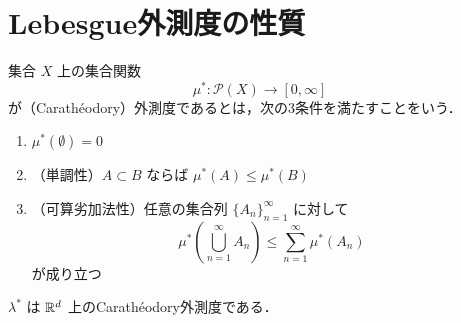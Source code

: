 
\section{Lebesgue外測度の性質}

\begin{definition}[Carathéodory外測度]
集合 $X$ 上の集合関数
\[
\mu^* : \mathcal P(X) \to [0,\infty]
\]
が（Carathéodory）外測度であるとは，次の3条件を満たすことをいう．
\begin{enumerate}
    \item $\mu^*(\emptyset)=0$
    \item （単調性）$A \subset B$ ならば $\mu^*(A) \le \mu^*(B)$
    \item （可算劣加法性）任意の集合列 $\{A_n\}_{n=1}^{\infty}$ に対して
    \[
    \mu^*\left(\bigcup_{n=1}^{\infty} A_n\right)
    \le
    \sum_{n=1}^{\infty} \mu^*(A_n)
    \]
    が成り立つ
\end{enumerate}
\end{definition}

\begin{theorem}[Lebesgue外測度は外測度] \label{thm:lebesgue-outer-measure}
$\lambda^*$ は $\mathbb R^d$ 上のCarathéodory外測度である．
\end{theorem}


